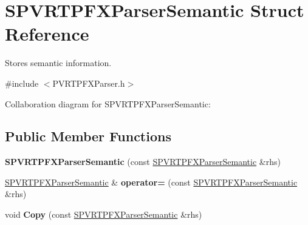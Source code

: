 \hypertarget{struct_s_p_v_r_t_p_f_x_parser_semantic}{\section{S\+P\+V\+R\+T\+P\+F\+X\+Parser\+Semantic Struct Reference}
\label{struct_s_p_v_r_t_p_f_x_parser_semantic}
}


Stores semantic information.  




{\ttfamily \#include $<$P\+V\+R\+T\+P\+F\+X\+Parser.\+h$>$}



Collaboration diagram for S\+P\+V\+R\+T\+P\+F\+X\+Parser\+Semantic\+:
\subsection*{Public Member Functions}
\begin{DoxyCompactItemize}
\item 
\hypertarget{struct_s_p_v_r_t_p_f_x_parser_semantic_ad16b6616b79e50da43e22e50a13a4e81}{{\bfseries S\+P\+V\+R\+T\+P\+F\+X\+Parser\+Semantic} (const \hyperlink{struct_s_p_v_r_t_p_f_x_parser_semantic}{S\+P\+V\+R\+T\+P\+F\+X\+Parser\+Semantic} \&rhs)}\label{struct_s_p_v_r_t_p_f_x_parser_semantic_ad16b6616b79e50da43e22e50a13a4e81}

\item 
\hypertarget{struct_s_p_v_r_t_p_f_x_parser_semantic_ac689bc42193b02e6dc4bfbc032503e51}{\hyperlink{struct_s_p_v_r_t_p_f_x_parser_semantic}{S\+P\+V\+R\+T\+P\+F\+X\+Parser\+Semantic} \& {\bfseries operator=} (const \hyperlink{struct_s_p_v_r_t_p_f_x_parser_semantic}{S\+P\+V\+R\+T\+P\+F\+X\+Parser\+Semantic} \&rhs)}\label{struct_s_p_v_r_t_p_f_x_parser_semantic_ac689bc42193b02e6dc4bfbc032503e51}

\item 
\hypertarget{struct_s_p_v_r_t_p_f_x_parser_semantic_a17c415bf773e2866738f49dc03d6cdec}{void {\bfseries Copy} (const \hyperlink{struct_s_p_v_r_t_p_f_x_parser_semantic}{S\+P\+V\+R\+T\+P\+F\+X\+Parser\+Semantic} \&rhs)}\label{struct_s_p_v_r_t_p_f_x_parser_semantic_a17c415bf773e2866738f49dc03d6cdec}

\end{DoxyCompactItemize}
